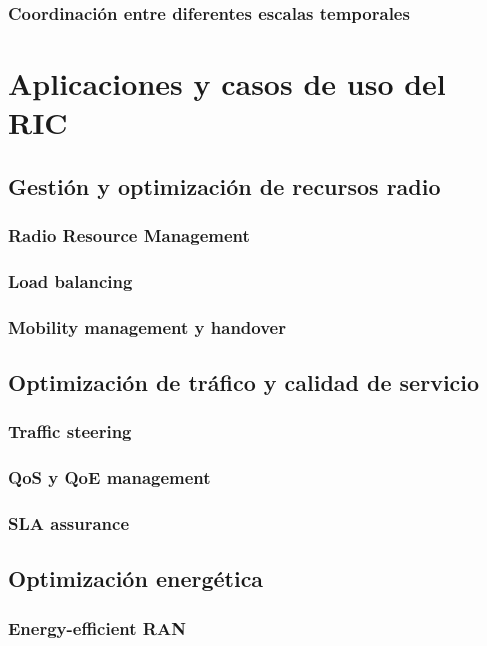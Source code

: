\documentclass[11pt,a4paper]{article}
\makeatletter
\let\ORIGsection\section
\def\section{\@nobreakfalse\ORIGsection}
\let\ORIGsubsection\subsection
\def\subsection{\@nobreakfalse\ORIGsubsection}
\let\ORIGsubsubsection\subsubsection
\def\subsubsection{\@nobreakfalse\ORIGsubsubsection}
\makeatother
\begin{document}
\subsubsection{Coordinación entre diferentes escalas temporales}


\section{Aplicaciones y casos de uso del RIC}

\subsection{Gestión y optimización de recursos radio}

\subsubsection{Radio Resource Management}
\subsubsection{Load balancing}
\subsubsection{Mobility management y handover}

\subsection{Optimización de tráfico y calidad de servicio}

\subsubsection{Traffic steering}
\subsubsection{QoS y QoE management}
\subsubsection{SLA assurance}

\subsection{Optimización energética}

\subsubsection{Energy-efficient RAN}
\end{document}
